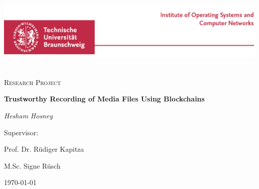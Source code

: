 \documentclass{report}
\begin{document}
\begin{titlepage}
	\centering
	\includegraphics[width=15cm,height=4cm]{images/ibr.png}\par\vspace{1cm}
	{\scshape\LARGE  \par}
	\vspace{1cm}
	{\scshape\Large Research Project\par}
	\vspace{1.5cm}
	{\huge\bfseries Trustworthy Recording of Media Files Using Blockchains \par}
	\vspace{1cm}
	{\huge\itshape Hesham Hosney\par}
        \vspace{2cm} 
	{\Large Supervisor:\par } 
	{\huge Prof. Dr. Rüdiger Kapitza\par}
        \vspace{.5cm} 
        {\huge M.Sc. Signe Rüsch}
	\vfill
	{\large \today\par}
\end{titlepage}


\cleardoublepage
\tableofcontents
\listoffigures
\cleardoublepage
\end{document}

